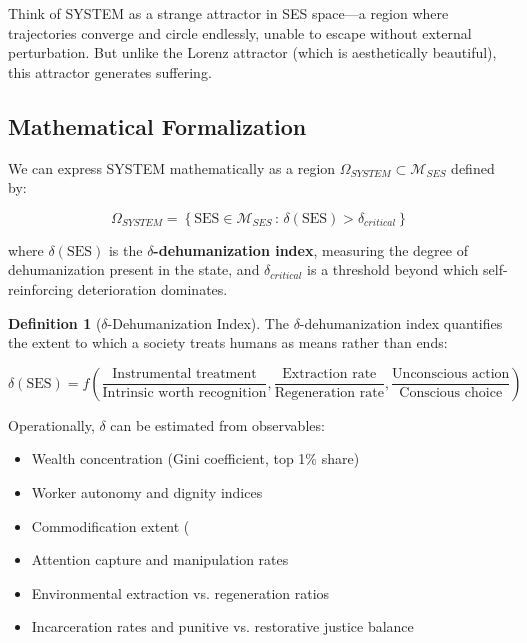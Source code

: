 \documentclass[11pt,a4paper]{article}
\newcommand{\deltaDehum}{$\delta$-dehumanization}
\theoremstyle{definition}
\newtheorem{definition}{Definition}[section]
\theoremstyle{remark}
\begin{document}
Think of SYSTEM as a strange attractor in SES space---a region where trajectories converge and circle endlessly, unable to escape without external perturbation. But unlike the Lorenz attractor (which is aesthetically beautiful), this attractor generates suffering.

\subsection{Mathematical Formalization}

We can express SYSTEM mathematically as a region $\Omega_{SYSTEM} \subset \mathcal{M}_{SES}$ defined by:

\begin{equation}
\Omega_{SYSTEM} = \left\{ \text{SES} \in \mathcal{M}_{SES} \,:\, \delta(\text{SES}) > \delta_{critical} \right\}
\end{equation}

where $\delta(\text{SES})$ is the \textbf{\deltaDehum{} index}, measuring the degree of dehumanization present in the state, and $\delta_{critical}$ is a threshold beyond which self-reinforcing deterioration dominates.

\begin{definition}[$\delta$-Dehumanization Index]\label{def:delta}
The \deltaDehum{} index quantifies the extent to which a society treats humans as means rather than ends:

\begin{equation}
\delta(\text{SES}) = f\left( \frac{\text{Instrumental treatment}}{\text{Intrinsic worth recognition}}, \frac{\text{Extraction rate}}{\text{Regeneration rate}}, \frac{\text{Unconscious action}}{\text{Conscious choice}} \right)
\end{equation}

Operationally, $\delta$ can be estimated from observables:
\begin{itemize}
    \item Wealth concentration (Gini coefficient, top 1\% share)
    \item Worker autonomy and dignity indices
    \item Commodification extent (%
    \item Attention capture and manipulation rates
    \item Environmental extraction vs. regeneration ratios
    \item Incarceration rates and punitive vs. restorative justice balance
\end{itemize}
\end{definition}
\end{document}
